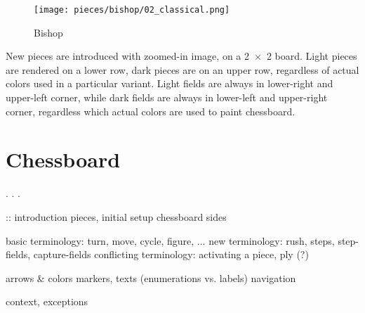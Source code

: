 \noindent
\begin{wrapfigure}[12]{l}{0.4\textwidth}
\centering
\texttt{[image: pieces/bishop/02\_classical.png]}
\caption{Bishop}
\label{fig:bishop/02_classical}
\end{wrapfigure}
New pieces are introduced with zoomed-in image, on a \mbox{2 $\times$ 2} board.
Light pieces are rendered on a lower row, dark pieces are on an upper row,
regardless of actual colors used in a particular variant. \newline
\indent
Light fields are always in lower-right and upper-left corner, while dark fields
are always in lower-left and upper-right corner, regardless which actual colors
are used to paint chessboard.


\section*{Chessboard}
\label{sec:Classical Chess/Chessboard}

. . .

\clearpage %

\noindent
\TODO :: introduction \newline
\textrightarrow pieces, initial setup \newline
\textrightarrow chessboard sides \newline

\clearpage %

\noindent
\textrightarrow basic terminology: turn, move, cycle, figure, ... \newline
\textrightarrow new terminology: rush, steps, step-fields, capture-fields \newline
\textrightarrow conflicting terminology: activating a piece, ply (?) \newline

\noindent
\textrightarrow arrows \& colors \newline
\textrightarrow markers, texts (enumerations vs. labels) \newline
\textrightarrow navigation \newline

\noindent
\textrightarrow context, exceptions \newline

\clearpage %
